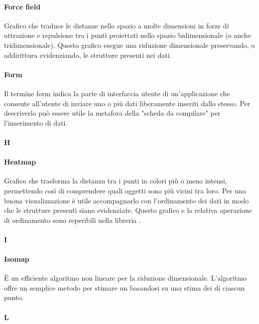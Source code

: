 \paragraph*{Force field}
Grafico che traduce le distanze nello spazio a molte dimensioni in forze di attrazione e repulsione tra i punti proiettati nello spazio bidimensionale (o anche tridimensionale). Questo grafico esegue una riduzione dimensionale preservando, o addirittura evidenziando, le strutture presenti nei dati.

\paragraph*{Form}
Il termine form indica la parte di interfaccia utente di un'applicazione che consente all'utente di inviare uno o più dati liberamente inseriti dallo stesso. Per descriverlo può essere utile la metafora della "scheda da compilare" per l'inserimento di dati. 

\paragraph*{H}

\paragraph*{Heatmap}
Grafico che trasforma la distanza tra i punti in colori più o meno intensi, permettendo così di comprendere quali oggetti sono più vicini tra loro. Per una buona visualizzazione è utile accompagnarlo con l'ordinamento dei dati in modo che le strutture presenti siano evidenziate. Questo grafico e la relativa operazione di ordinamento sono reperibili nella libreria .

\paragraph*{I}

\paragraph*{Isomap}
È un efficiente algoritmo non lineare per la riduzione dimensionale. L'algoritmo offre un semplice metodo per stimare un  basandosi su una stima dei  di ciascun punto.

\paragraph*{L}

